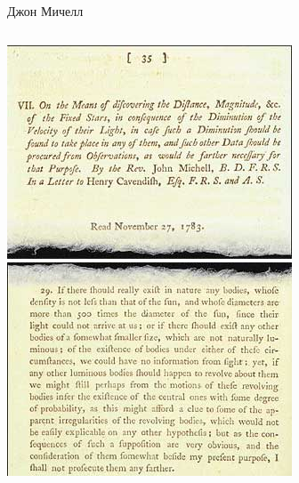 \documentclass[usenames,dvipsnames,pdftex,unicode,hidelinks]{beamer}
\begin{document}
  \begin{frame}{Джон Мичелл}
    \begin{columns}[t]
      \begin{column}{0.25\textwidth}
        \begin{center}
          \includegraphics[width=\textwidth]{michell-paper-001}\\
          \includegraphics[width=\textwidth]{michell-paper-002}


\end{center}
\end{column}
\end{columns}
\end{frame}
\end{document}
